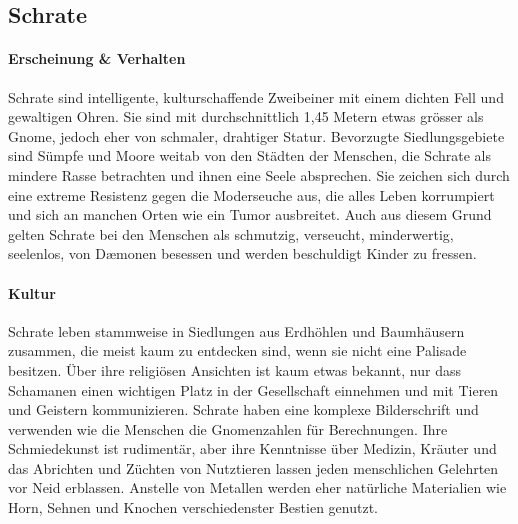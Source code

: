 \documentclass[10pt,twoside,twocolumn,openany]{book}
\begin{document}
\subsection{Schrate}


\paragraph{Erscheinung \& Verhalten}
Schrate sind intelligente, kulturschaffende Zweibeiner mit einem dichten Fell und gewaltigen Ohren. Sie sind mit durchschnittlich 1,45 Metern etwas grösser als Gnome, jedoch eher von schmaler, drahtiger Statur. Bevorzugte Siedlungsgebiete sind Sümpfe und Moore weitab von den Städten der Menschen, die Schrate als mindere Rasse betrachten und ihnen eine Seele absprechen. Sie zeichen sich durch eine extreme Resistenz gegen die Moderseuche aus, die alles Leben korrumpiert und sich an manchen Orten wie ein Tumor ausbreitet. Auch aus diesem Grund gelten Schrate bei den Menschen als schmutzig, verseucht, minderwertig, seelenlos, von D\ae monen besessen und werden beschuldigt Kinder zu fressen.

\paragraph{Kultur}
Schrate leben stammweise in Siedlungen  aus Erdhöhlen und Baumhäusern zusammen, die meist kaum zu entdecken sind, wenn sie nicht eine Palisade besitzen. Über ihre religiösen Ansichten ist kaum etwas bekannt, nur dass Schamanen einen wichtigen Platz in der Gesellschaft einnehmen und mit Tieren und Geistern kommunizieren.
Schrate haben eine komplexe Bilderschrift und verwenden wie die Menschen die Gnomenzahlen für Berechnungen. Ihre Schmiedekunst ist rudimentär, aber ihre Kenntnisse über Medizin, Kräuter und das Abrichten und Züchten von Nutztieren lassen jeden menschlichen Gelehrten vor Neid erblassen. Anstelle von Metallen werden eher natürliche Materialien wie Horn, Sehnen und Knochen verschiedenster Bestien genutzt.

\end{document}
